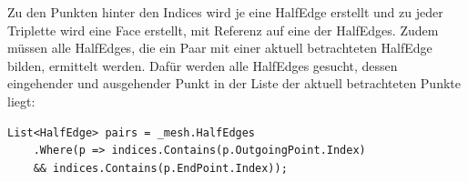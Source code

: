 Zu den Punkten hinter den Indices wird je eine HalfEdge erstellt und zu jeder Triplette wird eine Face erstellt, mit Referenz auf eine der HalfEdges. Zudem m\"ussen alle HalfEdges, die ein Paar mit einer aktuell betrachteten HalfEdge bilden, ermittelt werden. Daf\"ur werden alle HalfEdges gesucht, dessen eingehender und ausgehender Punkt in der Liste der aktuell betrachteten Punkte liegt: 
\begin{lstlisting}
List<HalfEdge> pairs = _mesh.HalfEdges
	.Where(p => indices.Contains(p.OutgoingPoint.Index)
	&& indices.Contains(p.EndPoint.Index));
\end{lstlisting}